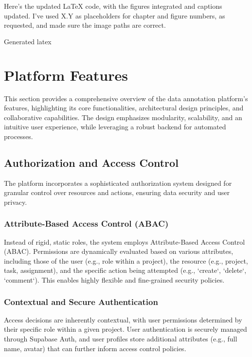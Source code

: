 Here's the updated LaTeX code, with the figures integrated and captions updated. I've used X.Y as placeholders for chapter and figure numbers, as requested, and made sure the image paths are correct.

Generated latex
\section{Platform Features}
This section provides a comprehensive overview of the data annotation platform's features, highlighting its core functionalities, architectural design principles, and collaborative capabilities. The design emphasizes modularity, scalability, and an intuitive user experience, while leveraging a robust backend for automated processes.

\subsection{Authorization and Access Control}
The platform incorporates a sophisticated authorization system designed for granular control over resources and actions, ensuring data security and user privacy.

\subsubsection{Attribute-Based Access Control (ABAC)}
Instead of rigid, static roles, the system employs Attribute-Based Access Control (ABAC). Permissions are dynamically evaluated based on various attributes, including those of the user (e.g., role within a project), the resource (e.g., project, task, assignment), and the specific action being attempted (e.g., `create`, `delete`, `comment`). This enables highly flexible and fine-grained security policies.

\subsubsection{Contextual and Secure Authentication}
Access decisions are inherently contextual, with user permissions determined by their specific role within a given project. User authentication is securely managed through Supabase Auth, and user profiles store additional attributes (e.g., full name, avatar) that can further inform access control policies.

